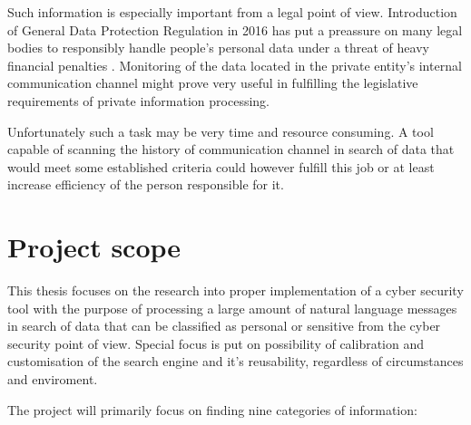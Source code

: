 \documentclass[a4paper,twoside,12pt]{book}
\begin{document}
Such information is especially important from a legal point of view. Introduction of General Data Protection
Regulation in 2016 has put a preassure on many legal bodies to responsibly handle people's personal data under
a threat of heavy financial penalties \cite{bib:bookRODO}. Monitoring of the data located in the private entity's internal communication
channel might prove very useful in fulfilling the legislative requirements of private information processing.

Unfortunately such a task may be very time and resource consuming. A tool capable of scanning the history of 
communication channel in search of data that would meet some established criteria could however fulfill this job or at least
increase efficiency of the person responsible for it.

\section{Project scope}

This thesis focuses on the research into proper implementation of a cyber security tool with the purpose of processing 
a large amount of natural language messages in search of data that can be classified as personal or sensitive from the cyber security
point of view. Special focus is put on possibility of calibration and customisation of the search engine and it's reusability, regardless of 
circumstances and enviroment.

The project will primarily focus on finding nine categories of information:
\end{document}
